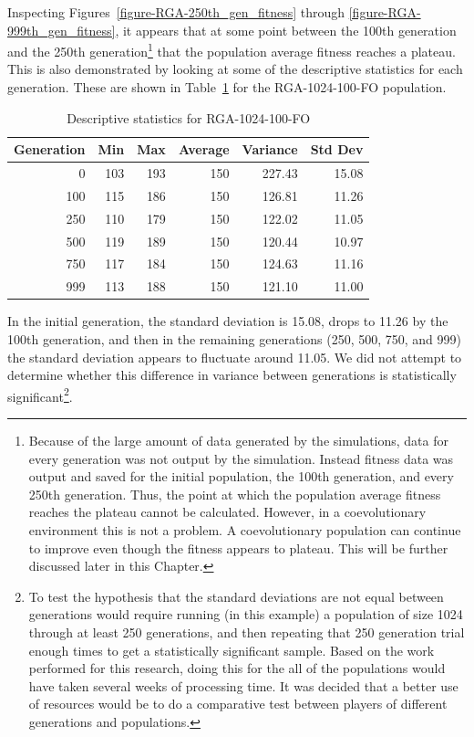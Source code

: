 Inspecting Figures~\ref{figure-RGA-250th_gen_fitness} through
\ref{figure-RGA-999th_gen_fitness}, it appears that at some point between the
100th generation and the 250th generation\footnote{Because of the large amount
of data generated by the simulations, data for every generation was not output
by the simulation. Instead fitness data was output and saved for the initial
population, the 100th generation, and every 250th generation. Thus, the point at
which the population average fitness reaches the plateau cannot be calculated.
However, in a coevolutionary environment this is not a problem. A coevolutionary
population can continue to improve even though the fitness appears to plateau.
This will be further discussed later in this Chapter.} that the population
average fitness reaches a plateau. This is also demonstrated by looking at some
of the descriptive statistics for each generation. These are shown in
Table~\ref{table-stats-for-s1024-n100-fo} for the RGA-1024-100-FO population.

\begin{table}[ht]
\begin{center}
\caption[RGA-1024-100-FO statistics]{Descriptive statistics for RGA-1024-100-FO}
\begin{tabular}{ | r || r | r | r | r | r |}
\hline
Generation & Min & Max & Average & Variance & Std Dev \\ \hline \hline
0   & 103 & 193 & 150 & 227.43 & 15.08 \\ \hline
100 & 115 & 186 & 150 & 126.81 & 11.26 \\ \hline
250 & 110 & 179 & 150 & 122.02 & 11.05 \\ \hline
500 & 119 & 189 & 150 & 120.44 & 10.97 \\ \hline
750 & 117 & 184 & 150 & 124.63 & 11.16 \\ \hline
999 & 113 & 188 & 150 & 121.10 & 11.00 \\ \hline
\end{tabular}
\label{table-stats-for-s1024-n100-fo}
\end{center}
\end{table}

In the initial generation, the standard deviation is 15.08, drops to 11.26 by
the 100th generation, and then in the remaining generations (250, 500, 750, and
999) the standard deviation appears to fluctuate around 11.05. We did not
attempt to determine whether this difference in variance between generations is
statistically significant\footnote{To test the hypothesis that the standard
deviations are not equal between generations would require running (in this
example) a population of size 1024 through at least 250 generations, and then
repeating that 250 generation trial enough times to get a statistically
significant sample. Based on the work performed for this research, doing this
for the all of the populations would have taken several weeks of processing
time. It was decided that a better use of resources would be to do a comparative
test between players of different generations and populations.}.

